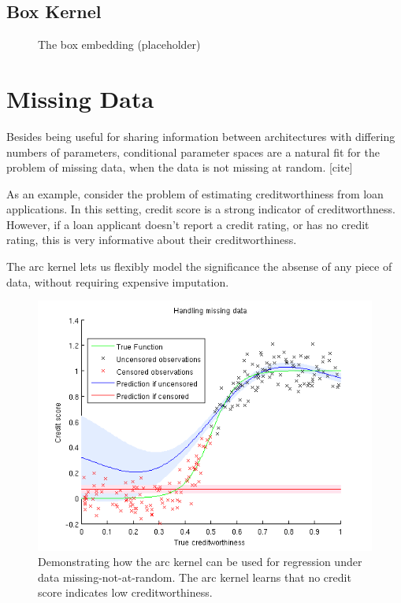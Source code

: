 \documentclass{article}
\begin{document}
\subsection{Box Kernel}
\begin{figure}
	\caption{The box embedding (placeholder)}
	
\vspace{-0.3cm}
\end{figure}
\label{fig:boxkernel}



\section{Missing Data}

Besides being useful for sharing information between architectures with differing numbers of parameters,
conditional parameter spaces are a natural fit for the problem of missing data, when the data is not missing at random. [cite]

As an example, consider the problem of estimating creditworthiness from loan applications.
In this setting, credit score is a strong indicator of creditworthness.
However, if a loan applicant doesn't report a credit rating, or has no credit rating, this is very informative about their creditworthiness.

The arc kernel lets us flexibly model the significance the absense of any piece of data, without requiring expensive imputation.

\begin{figure}
  \includegraphics[width=\columnwidth]{figures/missing_data_demo}
  \caption{Demonstrating how the arc kernel can be used for regression under data missing-not-at-random.
The arc kernel learns that no credit score indicates low creditworthiness.}
\end{figure}
\label{fig:missingdata}
\end{document}

